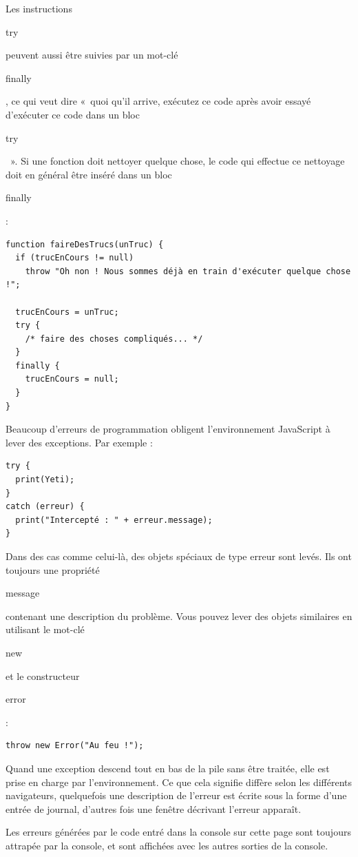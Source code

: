 \documentclass{FramateX}
\renewcommand{\texttt}[1]{\begin{sffamily}{#1}\end{sffamily}}
\begin{document}
Les instructions \texttt{try} peuvent aussi être suivies par un mot-clé
\texttt{finally}, ce qui veut dire «~quoi qu'il arrive, exécutez ce code
après avoir essayé d'exécuter ce code dans un bloc \texttt{try}~». Si
une fonction doit nettoyer quelque chose, le code qui effectue ce
nettoyage doit en général être inséré dans un bloc \texttt{finally} :

\begin{lstlisting}
function faireDesTrucs(unTruc) {
  if (trucEnCours != null)
    throw "Oh non ! Nous sommes déjà en train d'exécuter quelque chose !";

  trucEnCours = unTruc;
  try {
    /* faire des choses compliqués... */
  }
  finally {
    trucEnCours = null;
  }
}
\end{lstlisting}
\begin{center}\end{center}

Beaucoup d'erreurs de programmation obligent l'environnement JavaScript
à lever des exceptions. Par exemple :

\begin{lstlisting}
try {
  print(Yeti);
}
catch (erreur) {
  print("Intercepté : " + erreur.message);
}
\end{lstlisting}
Dans des cas comme celui-là, des objets spéciaux de type erreur sont
levés. Ils ont toujours une propriété \texttt{message} contenant une
description du problème. Vous pouvez lever des objets similaires en
utilisant le mot-clé \texttt{new} et le constructeur \texttt{error} :

\begin{lstlisting}
throw new Error("Au feu !");
\end{lstlisting}
\begin{center}\end{center}

Quand une exception descend tout en bas de la pile sans être traitée,
elle est prise en charge par l'environnement. Ce que cela signifie
diffère selon les différents navigateurs, quelquefois une description de
l'erreur est écrite sous la forme d'une entrée de journal, d'autres fois
une fenêtre décrivant l'erreur apparaît.

Les erreurs générées par le code entré dans la console sur cette page
sont toujours attrapée par la console, et sont affichées avec les autres
sorties de la console.

\begin{center}\end{center}
\end{document}
